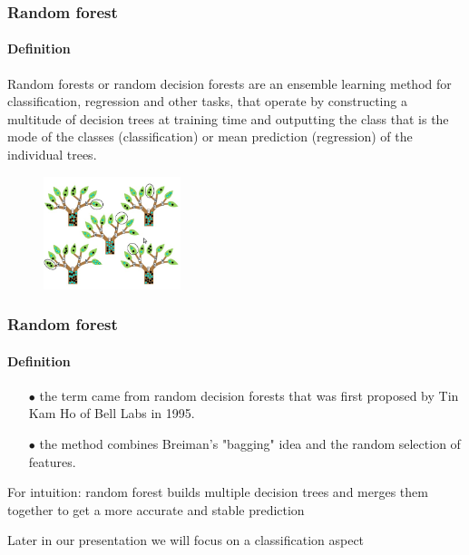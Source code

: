 \begin{frame}
	\frametitle{Random forest}
		\framesubtitle{Definition}

	\begin{block}{}
		Random forests or random decision forests are an ensemble learning method for classification, regression and other tasks, that operate by constructing a multitude of decision trees at training time and outputting the class that is the mode of the classes (classification) or mean prediction (regression) of the individual trees.
	\end{block}

	\vfill
	
	\begin{figure}
		\includegraphics[width=4cm]{./figures/las}
	\end{figure}

\end{frame}

\begin{frame}
	\frametitle{Random forest}
		\framesubtitle{Definition}

		\begin{itemize}
		  \item[$\bullet$]  the term came from random decision forests that was first proposed by Tin Kam Ho of Bell Labs in 1995.
		  \item[$\bullet$] the method combines Breiman's "bagging" idea and the random selection of features.
		\end{itemize}
		
		\vfill
		
		For intuition:
		random forest builds multiple decision trees and merges them together to get a more accurate and stable prediction

		\vfill

		\tiny Later in our presentation we will focus on a classification aspect

\end{frame}


